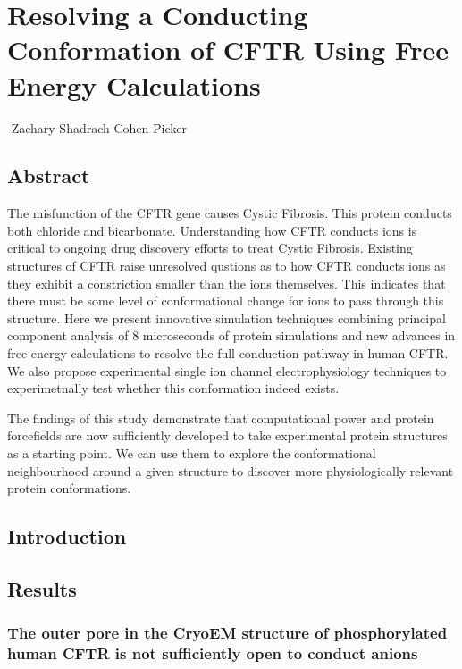 \chapter{Resolving a Conducting Conformation of CFTR Using Free Energy Calculations}
\label{chap:opening}
 {-Zachary Shadrach Cohen Picker}

\section*{\centering Abstract} 
The misfunction of the CFTR gene causes Cystic Fibrosis. This protein conducts both chloride and bicarbonate. Understanding how CFTR conducts ions is critical to ongoing drug discovery efforts to treat Cystic Fibrosis. Existing structures of CFTR raise unresolved qustions as to how CFTR conducts ions as they exhibit a constriction smaller than the ions themselves. This indicates that there must be some level of conformational change for ions to pass through this structure. Here we present innovative simulation techniques combining principal component analysis of 8 microseconds of protein simulations and new advances in free energy calculations to resolve the full conduction pathway in human CFTR. We also propose experimental single ion channel electrophysiology techniques to experimetnally test whether this conformation indeed exists.  

The findings of this study demonstrate that computational power and protein forcefields are now sufficiently developed to take experimental protein structures as a starting point. We can use them to explore the conformational neighbourhood around a given structure to discover more physiologically relevant protein conformations. 

\newline

\section{Introduction}

\section{Results}

\subsection{The outer pore in the CryoEM structure of phosphorylated human CFTR is not sufficiently open to conduct anions}

